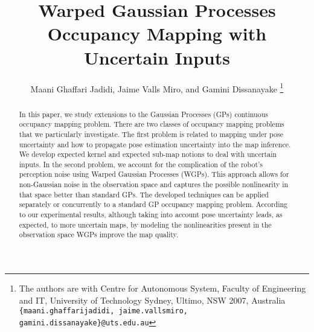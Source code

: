 \documentclass[letterpaper, 10 pt, journal, twoside]{IEEEtran}  %
\begin{document}
\title{Warped Gaussian Processes Occupancy Mapping with Uncertain Inputs}


\author{Maani Ghaffari Jadidi, Jaime Valls Miro, and Gamini Dissanayake
\thanks{The authors are with Centre for Autonomous System, Faculty of Engineering and IT, University of Technology Sydney, Ultimo, NSW 2007, Australia {\tt\small \{maani.ghaffarijadidi, jaime.vallsmiro, gamini.dissanayake\}@uts.edu.au}}
}




\maketitle


\begin{abstract}
In this paper, we study extensions to the Gaussian Processes (GPs) continuous occupancy mapping problem. There are two classes of occupancy mapping problems that we particularly investigate. The first problem is related to mapping under pose uncertainty and how to propagate pose estimation uncertainty into the map inference. We develop expected kernel and expected sub-map notions to deal with uncertain inputs. In the second problem, we account for the complication of the robot's perception noise using Warped Gaussian Processes (WGPs). This approach allows for non-Gaussian noise in the observation space and captures the possible nonlinearity in that space better than standard GPs. The developed techniques can be applied separately or concurrently to a standard GP occupancy mapping problem. According to our experimental results, although taking into account pose uncertainty leads, as expected, to more uncertain maps, by modeling the nonlinearities present in the observation space WGPs improve the map quality.
\end{abstract}
\end{document}
